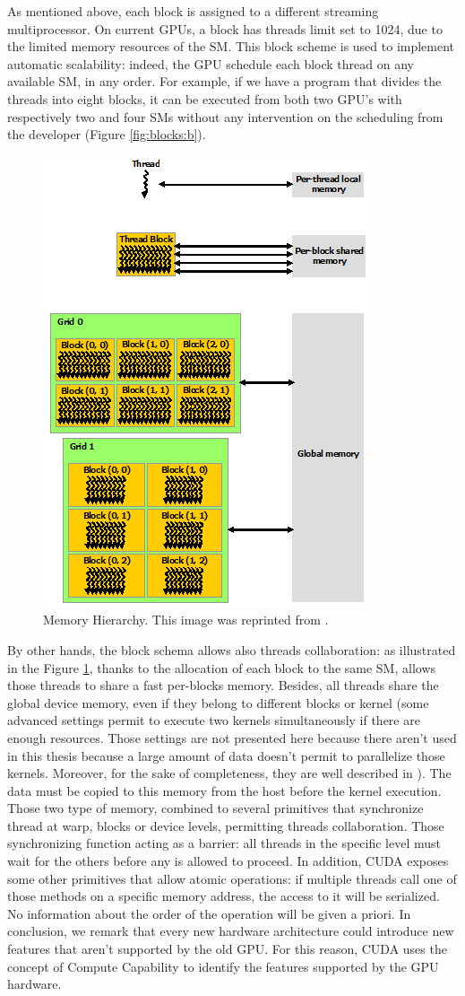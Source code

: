 As mentioned above, each block is assigned to a different streaming multiprocessor. On current GPUs, a block has threads limit set to 1024, due to the limited memory resources of the SM. This block scheme is used to implement automatic scalability: indeed, the GPU schedule each block thread on any available SM, in any order. For example, if we have a program that divides the threads into eight blocks, it can be executed from both two GPU's with respectively two and four SMs without any intervention on the scheduling from the developer (Figure \ref{fig:blocks:b}).
\begin{figure}
	\centering
	\includegraphics[width=0.52\linewidth]{0-resources/memory-hierarchy}
	\caption{Memory Hierarchy. This image was reprinted from \cite{cuda_manual}.}
	\label{fig:memory-hierarchy}
\end{figure}
By other hands, the block schema allows also threads collaboration: as illustrated in the Figure \ref{fig:memory-hierarchy}, thanks to the allocation of each block to the same SM, allows those threads to share a fast per-blocks memory. Besides, all threads share the global device memory, even if they belong to different blocks or kernel (some advanced settings permit to execute two kernels simultaneously if there are enough resources. Those settings are not presented here because there aren't used in this thesis because a large amount of data doesn't permit to parallelize those kernels. Moreover, for the sake of completeness, they are well described in \cite{cuda_manual}). The data must be copied to this memory from the host before the kernel execution. Those two type of memory, combined to several primitives that synchronize thread at warp, blocks or device levels, permitting threads collaboration. Those synchronizing function acting as a barrier: all threads in the specific level must wait for the others before any is allowed to proceed. In addition, CUDA exposes some other primitives that allow atomic operations: if multiple threads call one of those methods on a specific memory address, the access to it will be serialized. No information about the order of the operation will be given a priori.
In conclusion, we remark that every new hardware architecture could introduce new features that aren't supported by the old GPU. For this reason, CUDA uses the concept of Compute Capability to identify the features supported by the GPU hardware. 

